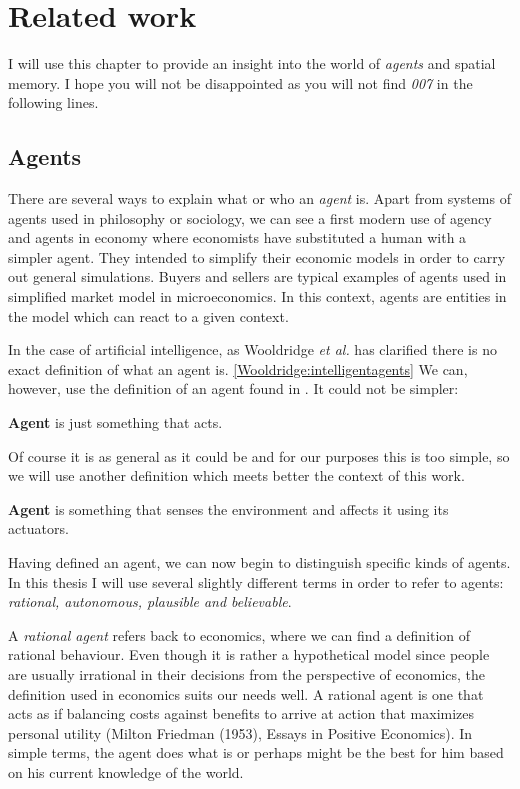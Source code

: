 \chapter{Related work}

I will use this chapter to provide an insight into the world of \emph{agents} and spatial memory. I hope you will not be disappointed as you will not find \textit{007} in the following lines.

\section{Agents}

There are several ways to explain what or who an \emph{agent} is. Apart from systems of agents used in philosophy or sociology, we can see a first modern use of agency and agents in economy where economists have substituted a human with a simpler agent. They intended to simplify their economic models in order to carry out general simulations. Buyers and sellers are typical examples of agents used in simplified market model in microeconomics. In this context, agents are entities in the model which can react to a given context.

In the case of artificial intelligence, as Wooldridge \textit{et al.} has clarified there is no exact definition of what an agent is. \ref{Wooldridge:intelligentagents} We can, however, use the definition of an agent found in \cite{russel2003ai}. It could not be simpler:

\begin{definition}{\bf Agent} is just something that acts.
\end{definition} 

Of course it is as general as it could be and for our purposes this is too simple, so we will use another definition which meets better the context of this work.

\begin{definition}{\bf Agent} is something that senses the environment and affects it using its actuators.
\end{definition} 

Having defined an agent, we can now begin to distinguish specific kinds of agents. In this thesis I will use several slightly different terms in order to refer to agents: \emph{rational, autonomous, plausible and believable}. 

A \emph{rational agent} refers back to economics, where we can find a definition of rational behaviour. Even though it is rather a hypothetical model since people are usually irrational in their decisions from the perspective of economics, the definition used in economics suits our needs well. A rational agent is one that acts as if balancing costs against benefits to arrive at action that maximizes personal utility (Milton Friedman (1953), Essays in Positive Economics). In simple terms, the agent does what is or perhaps might be the best for him based on his current knowledge of the world.
 
